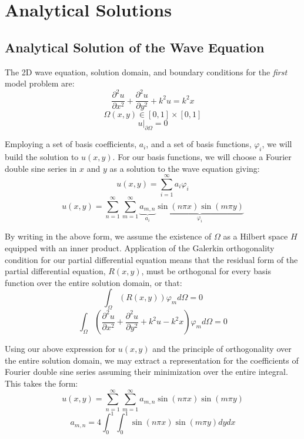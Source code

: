 \documentclass[10pt]{article}		%
\numberwithin{equation}{section}
\newcommand{\psder}[2]{\dfrac{\partial^2#1}{\partial#2^2}}		%
\begin{document}
\newpage

\section{Analytical Solutions}

\subsection{Analytical Solution of the Wave Equation}

The 2D wave equation, solution domain, and boundary conditions for the \textit{first} model problem are:
\begin{equation}
\psder{u}{x} + \psder{u}{y} + k^2u = k^2x
\end{equation}
\begin{equation}
\Omega(x,y) \in [0, 1] \times [0, 1]
\end{equation}
\begin{equation}
u \big|_{\partial \Omega} = 0
\end{equation}

Employing a set of basis coefficients, $a_i$, and a set of basis functions, $\varphi_i$, we will build the solution to $u(x ,y)$. For our basis functions, we will choose a Fourier double sine series in $x$ and $y$ as a solution to the wave equation giving:
\begin{equation}
u(x,y) = \sum_{i=1}^{\infty} a_{i} \varphi_i
\end{equation}
\begin{equation}
u(x,y) = \sum_{n=1}^{\infty} \sum_{m=1}^{\infty} \underbrace{a_{m,n}}_{a_i} \underbrace{\sin(n\pi x)\sin(m\pi y)}_{\varphi_i}
\end{equation}

By writing in the above form, we assume the existence of $\Omega$ as a Hilbert space $H$ equipped with an inner product. Application of the Galerkin orthogonality condition for our partial differential equation means that the residual form of the partial differential equation, $R(x, y)$, must be orthogonal for every basis function over the entire solution domain, or that:
\begin{equation}
\int_{\Omega}(R(x,y)) \varphi_m d\Omega = 0
\end{equation}
\begin{equation}
\int_{\Omega}\left(\psder{u}{x} + \psder{u}{y} + k^2u - k^2x\right) \varphi_m d\Omega = 0
\end{equation}

Using our above expression for $u(x,y)$ and the principle of orthogonality over the entire solution domain, we may extract a representation for the coefficients of Fourier double sine series assuming their minimization over the entire integral. This takes the form:
\begin{equation}
u(x,y) = \sum_{n=1}^{\infty} \sum_{m=1}^{\infty} a_{m,n} \sin(n\pi x)\sin(m\pi y)
\end{equation}
\begin{equation}
a_{m,n} = 4 \int_{0}^{1} \int_{0}^{1} \sin(n\pi x)\sin(m\pi y) dy dx
\end{equation}
\end{document}
